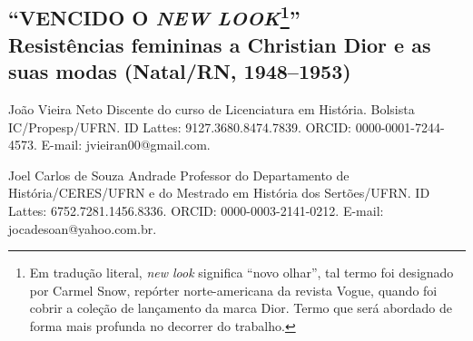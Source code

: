 \begin{refsection}
    \renewcommand{\thefigure}{\arabic{figure}}
    
    \chapter[``Vencido o {\itshape New Look}'': {\itshape resistências femininas a Christian Dior e as suas modas (Natal/RN, 1948--1953)}]{``VENCIDO O {\itshape NEW LOOK}\footnote{Em tradução literal, \textit{new look} significa ``novo olhar'', tal termo foi designado por Carmel Snow, repórter norte-americana da revista Vogue, quando foi cobrir a coleção de lançamento da marca Dior. Termo que será abordado de forma mais profunda no decorrer do trabalho.}''\\Resistências femininas a Christian Dior e as suas modas (Natal/RN, 1948--1953)}

    \label{chap:vencidonewlook}
    
    \articleAuthor
    {João Vieira Neto}
    {Discente do curso de Licenciatura em História. Bolsista IC/Propesp/UFRN. ID Lattes: 9127.3680.8474.7839. ORCID: 0000-0001-7244-4573. E-mail: jvieiran00@gmail.com.}

    \articleAuthor
    {Joel Carlos de Souza Andrade}
    {Professor do Departamento de História/CERES/UFRN e do Mestrado em História dos Sertões/UFRN. ID Lattes: 6752.7281.1456.8336. ORCID: 0000-0003-2141-0212. E-mail: jocadesoan@yahoo.com.br.}
    

\end{refsection}
